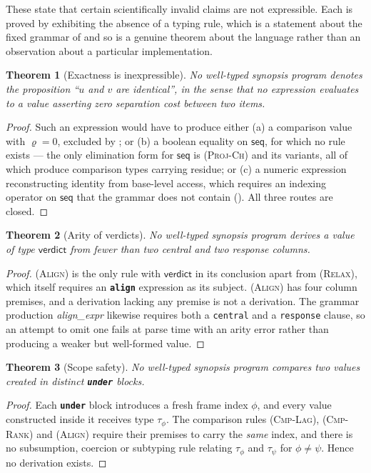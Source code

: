 \documentclass[11pt,twocolumn,a4paper]{article}
\theoremstyle{plain}
\newtheorem{theorem}{Theorem}[section]
\theoremstyle{definition}
\theoremstyle{remark}
\newcommand{\Res}{\varrho}                     %
\newcommand{\typ}[1]{\ensuremath{\mathsf{#1}}}
\newcommand{\kw}[1]{\texttt{\textbf{#1}}}
\begin{document}
These state that certain scientifically invalid claims are not
expressible. Each is proved by exhibiting the absence of a typing rule,
which is a statement about the fixed grammar of  and so
is a genuine theorem about the language rather than an observation about
a particular implementation.

\begin{theorem}[Exactness is inexpressible]
\label{thm:noexact}
No well-typed synopsis program denotes the proposition ``$u$ and $v$ are
identical'', in the sense that no expression evaluates to a value
asserting zero separation cost between two items.
\end{theorem}

\begin{proof}
Such an expression would have to produce either (a) a comparison value
with $\Res=0$, excluded by ; or (b) a boolean equality
on \typ{seq}, for which no rule exists --- the only elimination form for
\typ{seq} is \textsc{(Proj-Ch)} and its variants, all of which produce
comparison types carrying residue; or (c) a numeric expression
reconstructing identity from base-level access, which requires an
indexing operator on \typ{seq} that the grammar does not contain
(). All three routes are closed.
\end{proof}

\begin{theorem}[Arity of verdicts]
\label{thm:arity}
No well-typed synopsis program derives a value of type \typ{verdict}
from fewer than two central and two response columns.
\end{theorem}
\begin{proof}
\textsc{(Align)} is the only rule with \typ{verdict} in its conclusion
apart from \textsc{(Relax)}, which itself requires an \kw{align}
expression as its subject. \textsc{(Align)} has four column premises,
and a derivation lacking any premise is not a derivation. The grammar
production \textit{align\_expr} likewise requires both a
\texttt{central} and a \texttt{response} clause, so an attempt to omit
one fails at parse time with an arity error rather than producing a
weaker but well-formed value.
\end{proof}

\begin{theorem}[Scope safety]
\label{thm:scope}
No well-typed synopsis program compares two values created in distinct
\kw{under} blocks.
\end{theorem}
\begin{proof}
Each \kw{under} block introduces a fresh frame index $\phi$, and every
value constructed inside it receives type $\tau_\phi$. The comparison
rules \textsc{(Cmp-Lag)}, \textsc{(Cmp-Rank)} and \textsc{(Align)}
require their premises to carry the \emph{same} index, and there is no
subsumption, coercion or subtyping rule relating $\tau_\phi$ and
$\tau_\psi$ for $\phi\ne\psi$. Hence no derivation exists.
\end{proof}
\end{document}

